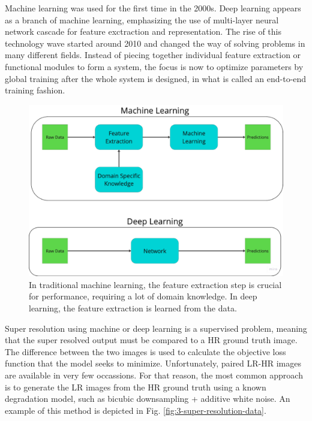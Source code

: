    Machine learning was used for the first time in the 2000s. 
    Deep learning appears as a branch of machine learning, emphasizing the use of multi-layer neural network cascade for feature exctraction and representation. 
    The rise of this technology wave started around 2010 and changed the way of solving problems in many different fields.
    Instead of piecing together individual feature extraction or functional modules to form a system, the focus is now to optimize parameters by global training after the whole system is designed, in what is called an end-to-end training fashion.

    \begin{figure}[H]
        \centering
        \includegraphics[width=\textwidth]{Includes/2-end-to-end-training.pdf}
        \caption{In traditional machine learning, the feature extraction step is crucial for performance, requiring a lot of domain knowledge. In deep learning, the feature extraction is learned from the data.}
        \label{fig:2-end-to-end-training}
    \end{figure}

    Super resolution using machine or deep learning is a supervised problem, meaning that the super resolved output must be compared to a HR ground truth image. 
    The difference between the two images is used to calculate the objective loss function that the model seeks to minimize.
    Unfortunately, paired LR-HR images are available in very few occassions.
    For that reason, the most common approach is to generate the LR images from the HR ground truth using a known degradation model, such as bicubic downsampling + additive white noise. An example of this method is depicted in Fig. \ref{fig:3-super-resolution-data}. 
    
